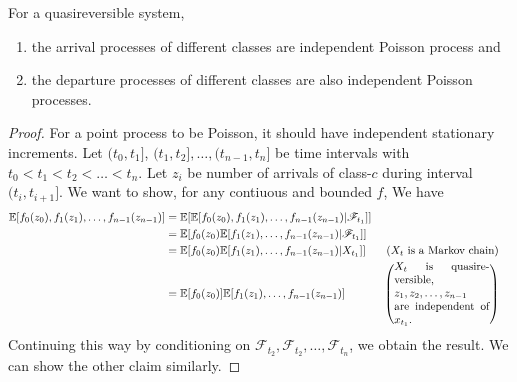 \documentclass[all-lectures.tex]{subfiles}
\begin{document}
\begin{prop}
For a quasireversible system, 
\begin{enumerate}[label=(\arabic*)]
\item  the arrival processes of different classes are independent Poisson process and 
\item the departure  processes of different classes are also independent Poisson processes.
\end{enumerate}
\end{prop}
\begin{proof}
For a point process to be Poisson, it should have independent stationary increments. Let $(t_0,t_1]$, $(t_1,t_2], \dots, (t_{n-1},t_n]$ be time intervals with $t_0 < t_1 < t_2<\dots < t_n$. Let $z_i$ be number of arrivals of class-$c$ during interval $(t_i,t_{i+1}]$. We want to show, for any contiuous and bounded $f$,
We have 
\begin{align*}
\E[f_0(z_0), f_1(z_1), \dots, f_{n-1}(z_{n-1})] &= \E[\E[f_0(z_0), f_1(z_1), \dots, f_{n-1}(z_{n-1})|\F_{t_1}]]\\
&= \E[f_0(z_0) \E[f_1(z_1), \dots, f_{n-1}(z_{n-1})|\F_{t_1}]] \\
&= \E[f_0(z_0) \E[f_1(z_1), \dots, f_{n-1}(z_{n-1})|X_{t_1}]] && \text{ ($X_t$ is a Markov chain)} \\
&=  \E[f_0(z_0)] \E[f_1(z_1), \dots, f_{n-1}(z_{n-1})] && \left(\parbox{3cm}{$X_t$ is quasireversible, $z_1, z_2, \dots, z_{n-1}$ are independent of $x_{t_1}$.} \right)
\end{align*}
Continuing this way by conditioning on $\mathcal{F}_{t_2},\mathcal{F}_{t_2},\dots,\mathcal{F}_{t_n}$, we obtain the result. We can show the other claim similarly.
\end{proof}
\end{document}
